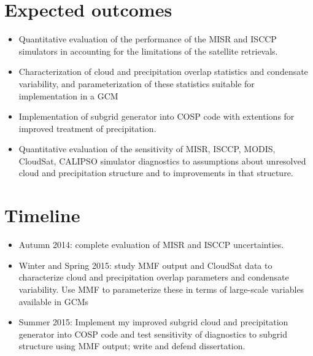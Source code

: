 \documentclass{article}
\begin{document}
\section{Expected outcomes}
\begin{itemize}
\item Quantitative evaluation of the performance of the MISR and ISCCP simulators in accounting for the limitations of the satellite retrievals.
\item Characterization of cloud and precipitation overlap statistics and condensate variability, and parameterization of these statistics suitable for implementation in a GCM
\item Implementation of \citep{raisanen_et_al_2004} subgrid generator into COSP code with extentions for improved treatment of precipitation.
\item Quantitative evaluation of the sensitivity of MISR, ISCCP, MODIS, CloudSat, CALIPSO simulator diagnostics to assumptions about unresolved cloud and precipitation structure and to improvements in that structure.
\end{itemize}


\section{Timeline}
\begin{itemize}
\item Autumn 2014: complete evaluation of MISR and ISCCP uncertainties.
\item Winter and Spring 2015: study MMF output and CloudSat data to characterize cloud and precipitation overlap parameters and condensate variability. Use MMF to parameterize these in terms of large-scale variables available in GCMs
\item Summer 2015: Implement my improved subgrid cloud and precipitation generator into COSP code and test sensitivity of diagnostics to subgrid structure using MMF output; write and defend dissertation.
\end{itemize}



\end{document}
